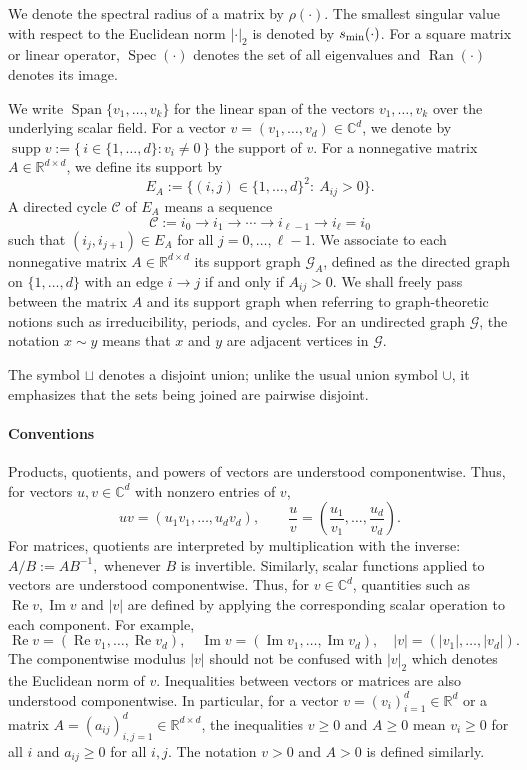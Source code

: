 \documentclass[11pt,twoside, a4paper]{article}
\numberwithin{equation}{section}
\numberwithin{figure}{section}
\theoremstyle{plain} %
\theoremstyle{definition}
\theoremstyle{remark}
\newcommand{\1} {\mspace{1 mu}}
\newcommand{\2} {\mspace{2 mu}}
\newcommand{\R} {\mathbb{R}}
\DeclareMathOperator{\re}{Re}
\DeclareMathOperator{\im}{Im}
\DeclareMathOperator{\supp}{supp}
\DeclareMathOperator{\spn}{Span}
\DeclareMathOperator{\Ran}{Ran}
\DeclareMathOperator{\Spec}{Spec}
\begin{document}
We denote the spectral radius of a matrix by $\rho(\cdot)$. The smallest singular value with respect to the Euclidean norm \(|\cdot|_2\) is denoted by  \(s_{\rm min}(\cdot)\). For a square matrix or linear operator, $\Spec(\cdot)$ denotes the set of all eigenvalues and $\Ran(\cdot)$ denotes its image.



 We write $\spn\{v_1,\dots,v_k\}$ for the linear span of the vectors $v_1,\dots,v_k$ over the underlying scalar field. 
For a vector $v=(v_1,\dots,v_d)\in\mathbb C^d$, we denote by  $\supp v := \{\, i\in\{1,\dots,d\}: v_i\ne 0\,\}$ the support of $v$.
For a nonnegative matrix $A\in\R^{d\times d}$, we define its support by
\begin{equation}\label{def.E}
  E_A:=\{(i,j)\in\{1,\dots,d\}^2:\ A_{ij}>0\}.
\end{equation}
A directed cycle \(\mathscr{C}\) of \(E_A\) means a sequence
\begin{equation}\label{def.cycle}
  \mathscr{C}:=i_0\to i_1\to \cdots \to i_{\ell-1}\to i_\ell=i_0
\end{equation}
such that \((i_j,i_{j+1})\in E_A\) for all \(j=0,\dots,\ell-1\).
We associate to each nonnegative matrix $A\in\mathbb R^{d\times d}$ its support graph $\mathcal{G}_A$, defined as the directed graph on $\{1,\dots,d\}$ with an edge $i\to j$ if and only if $A_{ij}>0$. We shall freely pass between the matrix $A$ and its support graph when referring to graph-theoretic notions such as irreducibility, periods, and cycles. For an undirected graph \(\mathcal G\), the notation \(x\sim y\) means that \(x\) and \(y\) are adjacent vertices in \(\mathcal G\).

The symbol $\sqcup$ denotes a disjoint union; unlike the usual union symbol $\cup$, it emphasizes that the sets being joined are pairwise disjoint.



\paragraph{Conventions}
Products, quotients, and powers of vectors are understood componentwise. Thus, for vectors $u,v\in\mathbb C^d$ with nonzero entries of $v$,
\[
uv=(u_1v_1,\dots, u_dv_d),\qquad 
\frac{u}{v}=\left(\frac{u_1}{v_1},\dots,\frac{u_d}{v_d}\right).
\]
For matrices, quotients are interpreted by multiplication with the inverse: 
$
A/B:=AB^{-1},
$
whenever $B$ is invertible. 
Similarly, scalar functions applied to vectors are understood componentwise. Thus,
for \(v\in\mathbb C^d\), quantities such as
$
  \re v,\im v
$
and $|v|$
are defined by applying the corresponding scalar operation to each
component. For example,
\[
  \re v=(\re v_1,\dots,\re v_d),\quad
  \im v=(\im v_1,\dots,\im v_d),\quad |v|=(|v_1|,\dots,|v_d|).
\]
The componentwise modulus \(|v|\) should not be confused with $|v|_2$ which denotes the Euclidean norm of \(v\).
Inequalities between vectors or matrices are also understood componentwise. In particular, for a vector $v=(v_i)_{i=1}^d\in\R^d$ or a matrix $A=(a_{ij})_{i,j=1}^d\in\R^{d\times d}$, the inequalities $v\ge0$ and $A\ge 0$ mean $v_i\ge0$ for all $i$ and  $a_{ij}\ge 0$ for all $i,j$. The notation $v>0$ and $A>0$ is defined similarly. 
\end{document}
